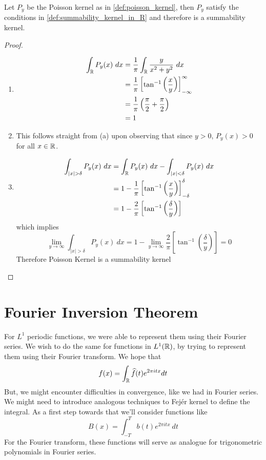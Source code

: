 \begin{proposition}
  \label{prop:poisson_kernel_is_summability_kernel}
  Let $P_y$ be the Poisson kernel as in \autoref{def:poisson_kernel}, then $P_y$ satisfy the conditions in \autoref{def:summability_kernel_in_R} and therefore is a summability kernel.
\end{proposition}
\begin{proof}
  \begin{enumerate}[label=(\alph*)]
    \item
      \begin{align*}
        \int_\mathbb R P_y(x) \ dx &= \frac{1}{\pi}\int_\mathbb R \frac{y}{x^2 + y^2} \ dx \\
        &= \frac{1}{\pi}\left[\tan^{-1}\left(\frac{x}{y}\right)\right]_{-\infty}^\infty\\
        &= \frac{1}{\pi}\left(\frac{\pi}{2}+\frac{\pi}{2}\right) \\
        &= 1
    \end{align*}

    \item This follows straight from (a) upon observing that since $y>0$, $P_y(x) > 0$ for all $x \in \mathbb R$. 

    \item \begin{align*}
        \int_{|x|>\delta} P_y(x) \ dx & = \int_\R P_y(x) \ dx - \int_{|x| < \delta} P_y(x) \ dx \\
        &= 1 - \frac{1}{\pi}\left[\tan^{-1}\left(\frac{x}{y}\right)\right]_{-\delta}^\delta\\
        &= 1 - \frac{2}{\pi}\left[\tan^{-1}\left(\frac{\delta}{y}\right)\right] \\
    \end{align*}
    which implies \begin{displaymath}
      \lim_{y \to \infty} \int_{|x|>\delta} P_y(x) \ dx = 1 - \lim_{y \to \infty}\frac{2}{\pi}\left[\tan^{-1}\left(\frac{\delta}{y}\right)\right] = 0
    \end{displaymath}
    Therefore Poisson Kernel is a summability kernel
  \end{enumerate}
\end{proof}

\section{Fourier Inversion Theorem}
For $L^1$ periodic functions, we were able to represent them using their Fourier series. We wish to do the same for functions in $L^1(\mathbb R)$, by trying to represent them using their Fourier transform. We hope that $$f(x) = \int_\mathbb R \widehat{f}(t) e^{2\pi itx} dt$$
But, we might encounter difficulties in convergence, like we had in Fourier series. We might need to introduce analogous techniques to Fej\'er kernel to define the integral. As a first step towards that we'll consider functions like $$B(x) = \int_{-T}^T b(t)e^{2 \pi itx} \ dt$$
For the Fourier transform, these functions will serve as analogue for trigonometric polynomials in Fourier series.

